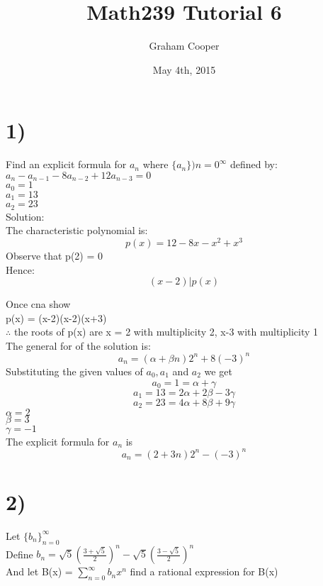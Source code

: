 \documentclass[12pt]{article}
\title{\vspace{-15ex}Math239 Tutorial 6 \vspace{-1ex}}
\date{May 4th, 2015}
\author{Graham Cooper}
\begin{document}
	\maketitle
	
	\section*{1)}
	Find an explicit formula for $a_n$ where $\{a_n \}){n=0}^{\infty}$ defined by:\\
	$a_n - a_{n-1} - 8a_{n-2} + 12a_{n-3} = 0$\\
	$a_0 = 1$\\
	$a_1 = 13$\\
	$a_2 = 23$\\
	
	Solution:\\
	
	The characteristic polynomial is:\\
	$$p(x) = 12-8x-x^2+x^3$$
	Observe that p(2) = 0\\
	Hence:\\
	$$(x-2)|p(x)$$
	
	Once cna show\\
	p(x) = (x-2)(x-2)(x+3)\\
	
	$\therefore$ the roots of p(x) are x = 2 with multiplicity 2, x-3 with multiplicity 1\\
	
	The general for of the solution is:\\
	$$a_n = (\alpha + \beta n)2^n + 8(-3)^n$$
	Substituting the given values of $a_0, a_1$ and $a_2$ we get\\
	$$a_0 = 1 = \alpha + \gamma$$
	$$a_1 = 13 = 2\alpha + 2\beta - 3\gamma$$
	$$a_2 = 23 = 4\alpha + 8\beta + 9\gamma$$
	$\alpha = 2$\\
	$\beta = 3$\\
	$\gamma = -1$\\
	
	The explicit formula for $a_n$ is\\
	$$a_n = (2+3n)2^n - (-3)^n$$
	
	\section*{2)}
	Let $\{b_n \}^{\infty}_{n=0}$\\
	Define $b_n = \sqrt{5}(\frac{3 + \sqrt{5}}{2})^n - \sqrt{5}(\frac{3-\sqrt{5}}{2})^n$\\
	And let B(x) = $\sum_{n=0}^{\infty}b_nx^n$ find a rational expression for B(x)\\
	
\end{document}
